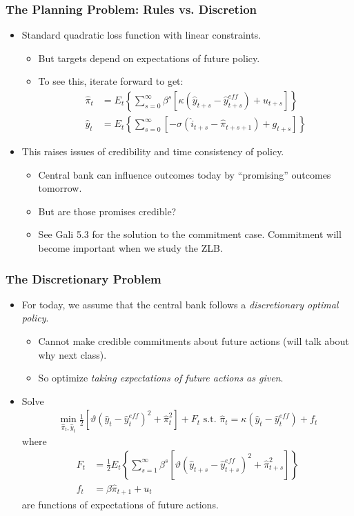 \documentclass[english,xcolor=svgnames]{beamer}
\begin{document}
\begin{frame}
\frametitle{The Planning Problem: Rules vs. Discretion}
\begin{itemize}
	\item Standard quadratic loss function with linear constraints.
	\begin{itemize}
		\item But targets depend on expectations of future policy.
		\item To see this, iterate forward to get:
		\begin{align*}
			\hat{\pi}_t &=E_t\left\{\sum_{s=0}^{\infty}\beta^s[\kappa (\hat{y}_{t+s} - \hat{y}_{t+s}^{eff})+u_{t+s}]\right\} \\
			\hat{y}_t &=E_t\left\{\sum_{s=0}^{\infty}\left[-\sigma (\hat{i}_{t+s}-\hat{\pi}_{t+s+1})+g_{t+s}\right]\right\} 
		\end{align*}
	\end{itemize}
 	\item This raises issues of credibility and time consistency of policy.
 	\begin{itemize}
 		\item Central bank can influence outcomes today by ``promising'' outcomes tomorrow.
 		\item But are those promises credible? 
 		\item See Gali 5.3 for the solution to the commitment case. Commitment will become important when we study the ZLB.
 	\end{itemize}
 	\end{itemize}
\end{frame}

\begin{frame}
\frametitle{The Discretionary Problem}
\begin{itemize}
	\item For today, we assume that the central bank follows a \emph{discretionary optimal policy}.
	\begin{itemize}
		\item Cannot make credible commitments about future actions (will talk about why next class).
		\item So optimize \emph{taking  expectations of future actions as given}.
	\end{itemize}
	\item Solve
		\begin{align*}\min_{\hat{\pi}_t,\hat{y}_{t}}\frac{1}{2}[\vartheta (\hat{y}_{t} - \hat{y}_{t}^{eff})^2+\hat{\pi}_{t}^2]+F_t\text{ s.t. }\hat{\pi}_t=\kappa(\hat{y}_{t} - \hat{y}_{t}^{eff})+f_t
	\end{align*}
	where
	\begin{align*}
		F_t &=\frac{1}{2}E_t\left\{\sum_{s=1}^{\infty}\beta^s\left[\vartheta (\hat{y}_{t+s} - \hat{y}_{t+s}^{eff})^2+\hat{\pi}_{t+s}^2\right]\right\} \\
		f_t &= \beta\hat{\pi}_{t+1}+u_t
	\end{align*}
 	are functions of expectations of future actions.
 	\end{itemize}
\end{frame}
\end{document}
